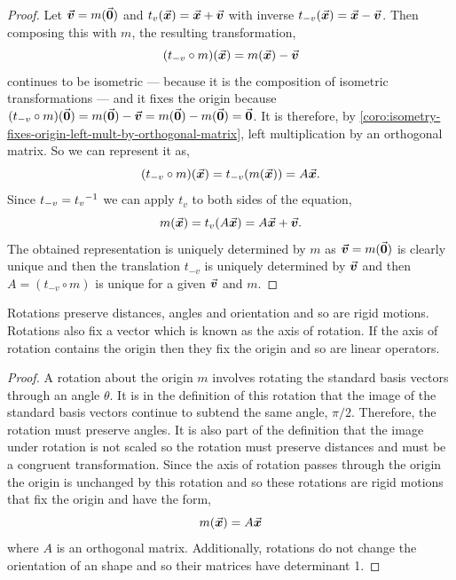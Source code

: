 \documentclass[MathsNotesBase.tex]{subfiles}
\begin{document}
{	\medskip
	\begin{proof}
		Let ${ \vec{\bm{v}} = m(\vec{\bm{0}}) }$ and ${ t_v(\vec{\bm{x}}) = \vec{\bm{x}} + \vec{\bm{v}} }$ with inverse ${ t_{-v}(\vec{\bm{x}}) = \vec{\bm{x}} - \vec{\bm{v}} }$. Then composing this with $m$, the resulting transformation,
		\[ (t_{-v} \circ m)(\vec{\bm{x}}) = m(\vec{\bm{x}}) - \vec{\bm{v}} \]
		continues to be isometric --- because it is the composition of isometric transformations --- and it fixes the origin because ${ (t_{-v} \circ m)(\vec{\bm{0}}) = m(\vec{\bm{0}}) - \vec{\bm{v}} = m(\vec{\bm{0}}) - m(\vec{\bm{0}}) = \vec{\bm{0}} }$. It is therefore, by \autoref{coro:isometry-fixes-origin-left-mult-by-orthogonal-matrix}, left multiplication by an orthogonal matrix. So we can represent it as,
		\[ (t_{-v} \circ m)(\vec{\bm{x}}) = t_{-v}(m(\vec{\bm{x}})) = A\vec{\bm{x}}. \]
		Since ${ t_{-v} = {t_v}^{-1} }$ we can apply $t_{v}$ to both sides of the equation,
		\[ m(\vec{\bm{x}}) = t_{v}(A\vec{\bm{x}}) = A\vec{\bm{x}} + \vec{\bm{v}}. \]
		The obtained representation is uniquely determined by $m$ as ${ \vec{\bm{v}} = m(\vec{\bm{0}}) }$ is clearly unique and then the translation $t_{-v}$ is uniquely determined by $\vec{\bm{v}}$ and then ${ A = (t_{-v} \circ m) }$ is unique for a given $\vec{\bm{v}}$ and $m$.
	\end{proof}

	\medskip{}
	
	\bigskip
	Rotations preserve distances, angles and orientation and so are rigid motions. Rotations also fix a vector which is known as the axis of rotation. If the axis of rotation contains the origin then they fix the origin and so are linear operators.
	
	\medskip
	\begin{proof}
		A rotation about the origin $m$ involves rotating the standard basis vectors through an angle $\theta$. It is in the definition of this rotation that the image of the standard basis vectors continue to subtend the same angle, ${ \pi/2 }$. Therefore, the rotation must preserve angles. It is also part of the definition that the image under rotation is not scaled so the rotation must preserve distances and must be a congruent transformation. Since the axis of rotation passes through the origin the origin is unchanged by this rotation and so these rotations are rigid motions that fix the origin and have the form,
		\[ m(\vec{\bm{x}}) = A\vec{\bm{x}} \]
		where $A$ is an orthogonal matrix. Additionally, rotations do not change the orientation of an shape and so their matrices have determinant 1.
	\end{proof}

}
\end{document}
